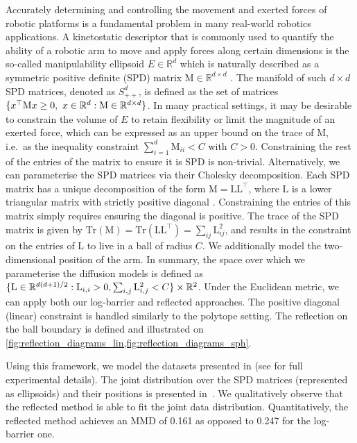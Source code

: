 Accurately determining and controlling the movement and exerted forces of robotic platforms is a fundamental problem in many real-world robotics applications.
A kinetostatic descriptor that is commonly used to quantify the ability of a robotic arm to move and apply forces along certain dimensions is the so-called manipulability ellipsoid $E\in\mathbb{R}^d$ \parencite{yoshikawa1985manipulability} which is naturally described as a symmetric positive definite (SPD) matrix $\mathrm{M} \in\mathbb{R}^{d\times d}$ \parencite{jaquier2021geometry}.
The manifold of such $d\times d$ SPD matrices, denoted as $S_{++}^d$, is defined as the set of matrices \( \{ x^\top \mathrm{M} x \geq 0 , \ x\in \mathbb{R}^d : \mathrm{M} \in \mathbb{R}^{d \times d} \} \).
In many practical settings, it may be desirable to constrain the volume of $E$ to retain flexibility or limit the magnitude of an exerted force, which can be expressed as an upper bound on the trace of $\mathrm{M}$, i.e.\ as the inequality constraint \(\sum_{i=1}^d \mathrm{M}_{ii} < C\) with $C >0$.
Constraining the rest of the entries of the matrix to ensure it is SPD is non-trivial.
Alternatively, we can parameterise the SPD matrices via their Cholesky decomposition.
Each SPD matrix has a unique decomposition of the form \(\mathrm{M} = \mathrm{L} \mathrm{L}^\top\), where \( \mathrm{L}\) is a lower triangular matrix with strictly positive diagonal \parencite[p.143]{golub2013matrix}.
Constraining the entries of this matrix simply requires ensuring the diagonal is positive.
The trace of the SPD matrix is given by \(\mathrm{Tr}(\mathrm{M}) = \mathrm{Tr}(\mathrm{L} \mathrm{L}^\top) = \sum_{ij}\mathrm{L}_{ij}^2\), and results in the constraint on the entries of $\mathrm{L}$ to live in a ball of radius $C$.
We additionally model the two-dimensional position of the arm.
In summary, the space over which we parameterise the diffusion models is defined as $\{ \mathrm{L} \in \mathbb{R}^{d(d+1)/2} : \mathrm{L}_{i,i} > 0, \sum_{i,j} \mathrm{L}_{i,j}^2 < C \} \times \mathbb{R}^2$.
Under the Euclidean metric, we can apply both our log-barrier and reflected approaches.
The positive diagonal (linear) constraint is handled similarly to the polytope setting.
The reflection on the ball boundary is defined and illustrated on \cref{fig:reflection_diagrams_lin,fig:reflection_diagrams_sph}.

Using this framework, we model the datasets presented in \cite{jaquier2021geometry} (see  for full experimental details).
The joint distribution over the SPD matrices (represented as ellipsoids) and their positions is presented in~.
We qualitatively observe that the reflected method is able to fit the joint data distribution.
Quantitatively, the reflected method achieves an MMD of 0.161 as opposed to 0.247 for the log-barrier one.

